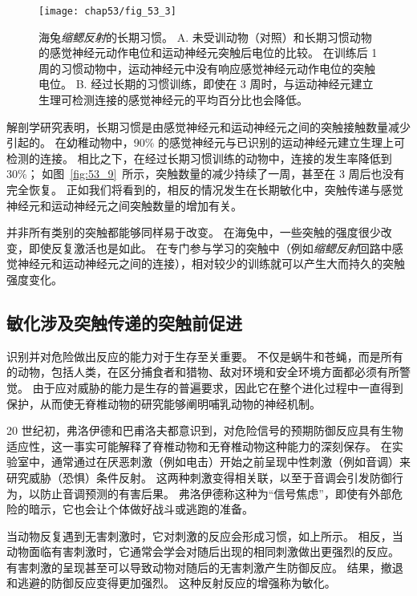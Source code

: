 \begin{figure}[htbp]
	\centering
	\texttt{[image: chap53/fig\_53\_3]}
	\caption{海兔\textit{缩鳃反射}的长期习惯\cite{castellucci1978cellular}。
		A. 未受训动物（对照）和长期习惯动物的感觉神经元动作电位和运动神经元突触后电位的比较。
		在训练后 1 周的习惯动物中，运动神经元中没有响应感觉神经元动作电位的突触电位。
		B. 经过长期的习惯训练，即使在 3 周时，与运动神经元建立生理可检测连接的感觉神经元的平均百分比也会降低。}
	\label{fig:53_3}
\end{figure}


解剖学研究表明，长期习惯是由感觉神经元和运动神经元之间的突触接触数量减少引起的。
在幼稚动物中，90\% 的感觉神经元与已识别的运动神经元建立生理上可检测的连接。
相比之下，在经过长期习惯训练的动物中，连接的发生率降低到 30\%；
如图~\ref{fig:53_9}~所示，突触数量的减少持续了一周，甚至在 3 周后也没有完全恢复。
正如我们将看到的，相反的情况发生在长期敏化中，突触传递与感觉神经元和运动神经元之间突触数量的增加有关。


并非所有类别的突触都能够同样易于改变。
在海兔中，一些突触的强度很少改变，即使反复激活也是如此。
在专门参与学习的突触中（例如\textit{缩鳃反射}回路中感觉神经元和运动神经元之间的连接），相对较少的训练就可以产生大而持久的突触强度变化。




\subsection{敏化涉及突触传递的突触前促进}

识别并对危险做出反应的能力对于生存至关重要。
不仅是蜗牛和苍蝇，而是所有的动物，包括人类，在区分捕食者和猎物、敌对环境和安全环境方面都必须有所警觉。
由于应对威胁的能力是生存的普遍要求，因此它在整个进化过程中一直得到保护，从而使无脊椎动物的研究能够阐明哺乳动物的神经机制。


20 世纪初，弗洛伊德和巴甫洛夫都意识到，对危险信号的预期防御反应具有生物适应性，这一事实可能解释了脊椎动物和无脊椎动物这种能力的深刻保存。
在实验室中，通常通过在厌恶刺激（例如电击）开始之前呈现中性刺激（例如音调）来研究威胁（恐惧）条件反射。
这两种刺激变得相关联，以至于音调会引发防御行为，以防止音调预测的有害后果。
弗洛伊德称这种为“信号焦虑”，即使有外部危险的暗示，它也会让个体做好战斗或逃跑的准备。


当动物反复遇到无害刺激时，它对刺激的反应会形成习惯，如上所示。
相反，当动物面临有害刺激时，它通常会学会对随后出现的相同刺激做出更强烈的反应。
有害刺激的呈现甚至可以导致动物对随后的无害刺激产生防御反应。
结果，撤退和逃避的防御反应变得更加强烈。
这种反射反应的增强称为敏化。




